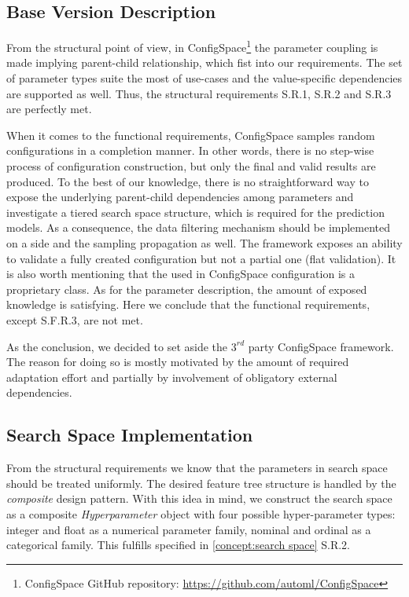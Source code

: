 \subsection{Base Version Description}
From the structural point of view, in ConfigSpace\footnote{ConfigSpace GitHub repository: \url{https://github.com/automl/ConfigSpace}} the parameter coupling is made implying parent-child relationship, which fist into our requirements. The set of parameter types suite the most of use-cases and the value-specific dependencies are supported as well. Thus, the structural requirements S.R.1, S.R.2 and S.R.3 are perfectly met.

When it comes to the functional requirements, ConfigSpace samples random configurations in a completion manner. In other words, there is no step-wise process of configuration construction, but only the final and valid results are produced. To the best of our knowledge, there is no straightforward way to expose the underlying parent-child dependencies among parameters and investigate a tiered search space structure, which is required for the prediction models. As a consequence, the data filtering mechanism should be implemented on a side and the sampling propagation as well. The framework exposes an ability to validate a fully created configuration but not a partial one (flat validation). It is also worth mentioning that the used in ConfigSpace configuration is a proprietary class. As for the parameter description, the amount of exposed knowledge is satisfying. Here we conclude that the functional requirements, except S.F.R.3, are not met.

As the conclusion, we decided to set aside the $3^{rd}$ party ConfigSpace framework. The reason for doing so is mostly motivated by the amount of required adaptation effort and partially by involvement of obligatory external dependencies.


\subsection{Search Space Implementation}\label{impl: search space impl}
From the structural requirements we know that the parameters in search space should be treated uniformly. The desired feature tree structure is handled by the \emph{composite} design pattern. With this idea in mind, we construct the search space as a composite \emph{Hyperparameter} object with four possible hyper-parameter types: integer and float as a numerical parameter family, nominal and ordinal as a categorical family. This fulfills specified in \cref{concept:search space} S.R.2.

